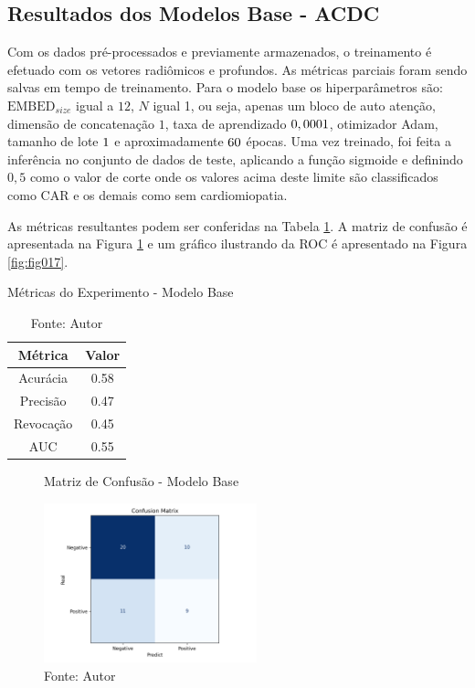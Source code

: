 \subsection{Resultados dos Modelos Base - ACDC}
\label{subsec:resultados_acdc_base}

Com os dados pré-processados e previamente armazenados, o treinamento é efetuado com os vetores radiômicos e profundos. As métricas parciais foram sendo salvas em tempo de treinamento. Para o modelo base os hiperparâmetros são: $\text{EMBED}_{size}$ igual a $12$, $N$ igual 1, ou seja, apenas um bloco de auto atenção, dimensão de concatenação $1$, taxa de aprendizado $0,0001$, otimizador \gls{Adam}, tamanho de lote $1$ e aproximadamente $60$ épocas. Uma vez treinado, foi feita a inferência no conjunto de dados de teste, aplicando a função sigmoide e definindo $0,5$ como o valor de corte onde os valores acima deste limite são classificados como \gls{CAR} e os demais como sem cardiomiopatia. 

As métricas resultantes podem ser conferidas na Tabela \ref{tab:metrics}. A matriz de confusão é apresentada na Figura \ref{fig:fig016} e um gráfico ilustrando da \gls{ROC} é apresentado na Figura \ref{fig:fig017}.
\newline

\begin{table}[h!]
    \centering
    \caption{Métricas do Experimento - Modelo Base}
    \renewcommand{\arraystretch}{1} %
    \begin{tabular}{|c|c|}
    \hline 
          \textbf{Métrica} & \textbf{Valor} \\ 
    \hline 
        Acurácia & 0.58 \\ 
    \hline 
        Precisão & 0.47 \\ 
    \hline 
        Revocação & 0.45 \\ 
    \hline 
        AUC & 0.55 \\ 
    \hline 
    \end{tabular} 
    \caption*{Fonte: Autor}
    \label{tab:metrics}
\end{table}

\begin{figure}[h!]
    \centering
    \caption{Matriz de Confusão -  Modelo Base}
    \includegraphics[width=0.55\textwidth]{figures/fig016.png}
    \caption*{Fonte: Autor}
    \label{fig:fig016}
\end{figure}

